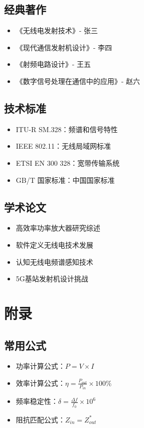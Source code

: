 \documentclass[12pt,UTF8]{ctexbook}
\begin{document}
\section{经典著作}
\begin{itemize}[leftmargin=3.5em]
    \item 《无线电发射技术》- 张三
    \item 《现代通信发射机设计》- 李四
    \item 《射频电路设计》- 王五
    \item 《数字信号处理在通信中的应用》- 赵六
\end{itemize}

\section{技术标准}
\begin{itemize}[leftmargin=3.5em]
    \item ITU-R SM.328：频谱和信号特性
    \item IEEE 802.11：无线局域网标准
    \item ETSI EN 300 328：宽带传输系统
    \item GB/T 国家标准：中国国家标准
\end{itemize}

\section{学术论文}
\begin{itemize}[leftmargin=3.5em]
    \item 高效率功率放大器研究综述
    \item 软件定义无线电技术发展
    \item 认知无线电频谱感知技术
    \item 5G基站发射机设计挑战
\end{itemize}

\chapter{附录}

\section{常用公式}
\begin{itemize}[leftmargin=3.5em]
    \item 功率计算公式：$P = V \times I$
    \item 效率计算公式：$\eta = \frac{P_{out}}{P_{in}} \times 100\%$
    \item 频率稳定性：$\delta = \frac{\Delta f}{f_0} \times 10^6$
    \item 阻抗匹配公式：$Z_{in} = Z_{out}^*$
\end{itemize}
\end{document}
